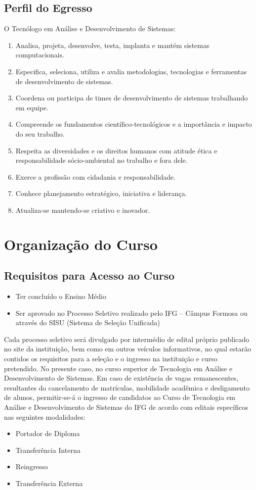 \documentclass[
	10pt,				%
	openright,			%
	twoside,			%
	a4paper,			%
	english,			%
	french,				%
	brazil,				%
	sumario=tradicional
]{abntex2}
\begin{document}
\section*{Perfil do Egresso}
O Tecnólogo em Análise e Desenvolvimento de Sistemas:
\begin{enumerate}
	\item Analisa, projeta, desenvolve, testa, implanta e mantém sistemas computacionais. 
	\item Especifica, seleciona, utiliza e avalia metodologias, tecnologias e ferramentas de desenvolvimento de sistemas. 
	\item Coordena ou participa de times de desenvolvimento de sistemas trabalhando em equipe.
	\item Compreende os fundamentos científico-tecnológicos e a importância e impacto do seu trabalho.
	\item Respeita as diversidades e os direitos humanos com atitude ética e responsabilidade sócio-ambiental no trabalho e fora dele.
	\item Exerce a profissão com cidadania e responsabilidade.
	\item Conhece planejamento estratégico, iniciativa e liderança.
	\item Atualiza-se mantendo-se criativo e inovador.
\end{enumerate}

\chapter{Organização do Curso}\label{organizacao}

\section*{Requisitos para Acesso ao Curso}

\begin{itemize}
	\item Ter concluído o Ensino Médio
	\item Ser aprovado no Processo Seletivo realizado pelo IFG – Câmpus Formosa ou através do SISU (Sistema de Seleção Unificada)
\end{itemize}

Cada processo seletivo será divulgado por intermédio de edital próprio publicado no site da instituição, bem como em outros veículos informativos, no qual estarão contidos os requisitos para a seleção e o ingresso na instituição e curso pretendido. 
No presente caso, no curso superior de Tecnologia em Análise e Desenvolvimento de Sistemas.
Em caso de existência de vagas remanescentes, resultantes do cancelamento de matrículas, mobilidade acadêmica e desligamento de alunos, permitir-se-á o ingresso de candidatos ao Curso de Tecnologia em Análise e Desenvolvimento de Sistemas do IFG de acordo com editais específicos nas seguintes modalidades: 
\begin{itemize}
	\item Portador de Diploma
	\item Transferência Interna
	\item Reingresso
	\item Transferência Externa
\end{itemize}
\end{document}
